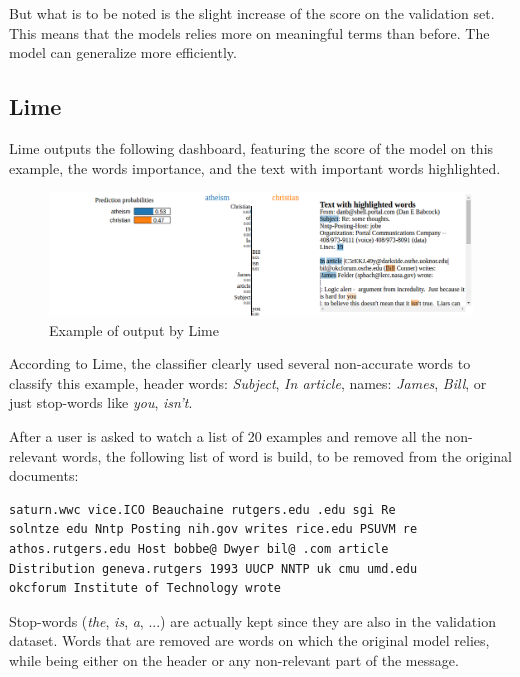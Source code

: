 \documentclass[a4paper,11pt]{kth-mag}
\begin{document}
But what is to be noted is the slight increase of the score on the validation set. This means that the models relies more on meaningful terms than before. The model can generalize more efficiently. 

\subsection{Lime}

Lime outputs the following dashboard, featuring the score of the model on this example, the words importance, and the text with important words highlighted.

\begin{figure}[!h]
	\centering
   	\def\svgwidth{\columnwidth}
	\includegraphics[scale=0.35]{img/lime-output.png}
    \caption{Example of output by Lime}
\end{figure}

According to Lime, the classifier clearly used several non-accurate words to classify this example, header words: \textit{Subject}, \textit{In article}, names: \textit{James}, \textit{Bill}, or just stop-words like \textit{you}, \textit{isn't}.

After a user is asked to watch a list of 20 examples and remove all the non-relevant words, the following list of word is build, to be removed from the original documents:

\begin{center}
\begin{verbatim}
saturn.wwc vice.ICO Beauchaine rutgers.edu .edu sgi Re
solntze edu Nntp Posting nih.gov writes rice.edu PSUVM re
athos.rutgers.edu Host bobbe@ Dwyer bil@ .com article
Distribution geneva.rutgers 1993 UUCP NNTP uk cmu umd.edu
okcforum Institute of Technology wrote
\end{verbatim}
\end{center}

Stop-words (\textit{the}, \textit{is}, \textit{a}, ...) are actually kept since they are also in the validation dataset. Words that are removed are words on which the original model relies, while being either on the header or any non-relevant part of the message.
\end{document}

